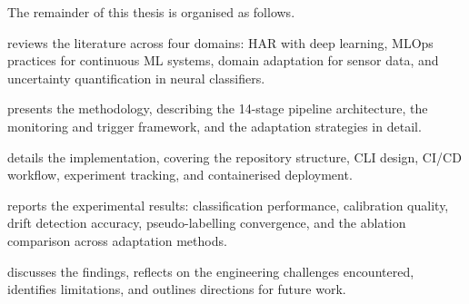 The remainder of this thesis is organised as follows.

 reviews the literature across four domains: HAR with deep
learning, MLOps practices for continuous ML systems, domain adaptation for
sensor data, and uncertainty quantification in neural classifiers.

 presents the methodology, describing the 14-stage
pipeline architecture, the monitoring and trigger framework, and the adaptation
strategies in detail.

 details the implementation, covering the repository
structure, CLI design, CI/CD workflow, experiment tracking, and containerised
deployment.

 reports the experimental results: classification
performance, calibration quality, drift detection accuracy, pseudo-labelling
convergence, and the ablation comparison across adaptation methods.

 discusses the findings, reflects on the engineering
challenges encountered, identifies limitations, and outlines directions for
future work.
